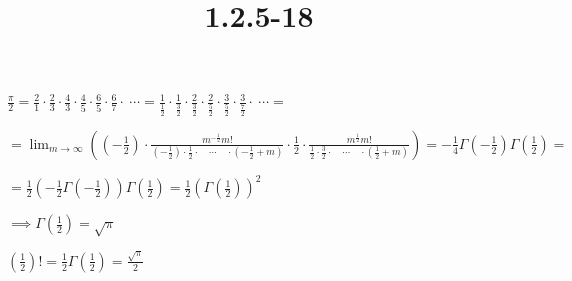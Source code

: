 \documentclass{article}
\title{1.2.5-18}
\begin{document}
\maketitle

\( \frac{\pi}{2} = \frac{2}{1} \cdot \frac{2}{3} \cdot \frac{4}{3} \cdot \frac{4}{5} \cdot \frac{6}{5} \cdot \frac{6}{7} \cdot\ \cdots = \frac{1}{\frac{1}{2}} \cdot \frac{1}{\frac{3}{2}} \cdot \frac{2}{\frac{3}{2}} \cdot \frac{2}{\frac{5}{2}} \cdot \frac{3}{\frac{5}{2}} \cdot \frac{3}{\frac{7}{2}} \cdot\ \cdots = \)

\( = \lim_{m\to\infty} ((-\frac{1}{2}) \cdot \frac{m^{-\frac{1}{2}}m!}{(-\frac{1}{2}) \cdot \frac{1}{2} \cdot \quad \cdots \quad \cdot (-\frac{1}{2} + m)} \cdot \frac{1}{2} \cdot \frac{m^{\frac{1}{2}} m!}{\frac{1}{2} \cdot \frac{3}{2} \cdot \quad \cdots \quad \cdot (\frac{1}{2} + m)}) = -\frac{1}{4} \Gamma(-\frac{1}{2})\Gamma(\frac{1}{2}) = \)

\( = \frac{1}{2} (-\frac{1}{2}\Gamma(-\frac{1}{2}))\Gamma(\frac{1}{2}) = \frac{1}{2}(\Gamma(\frac{1}{2}))^2 \)

\( \implies \Gamma(\frac{1}{2}) = \sqrt{\pi} \)

\( (\frac{1}{2})! = \frac{1}{2} \Gamma(\frac{1}{2}) = \frac{\sqrt{\pi}}{2} \)
\end{document}

